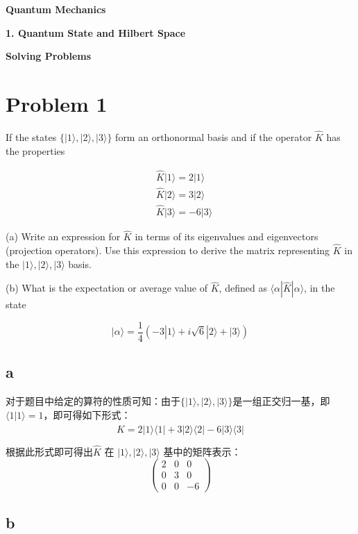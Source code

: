 \documentclass[dvipsnames, svgnames,a4paper,11pt]{article}
\begin{document}
	
	
	
	
	
	\begin{center}
		\LARGE \textbf{Quantum Mechanics }  
		
		\LARGE \textbf{1. Quantum State and Hilbert Space}

		\LARGE \textbf{Solving Problems}
	\end{center}

	\section{Problem 1} 
	If the states $\{|1\rangle,|2\rangle,|3\rangle\}$ form an orthonormal basis and if the operator $\hat{K}$ has the properties

	$$\begin{aligned}&\hat{K}|1\rangle=2|1\rangle\\&\hat{K}|2\rangle=3|2\rangle\\&\hat{K}|3\rangle=-6|3\rangle\end{aligned}$$
	
	(a) Write an expression for $\hat{K}$ in terms of its eigenvalues and eigenvectors (projection operators).
	Use this expression to derive the matrix representing $\hat{K}$ in the $|1\rangle,|2\rangle,|3\rangle$ basis.
	
	(b) What is the expectation or average value of $\hat{K}$, defined as $\langle\alpha|\hat{K}|\alpha\rangle$, in the state
	
	$$|\alpha\rangle=\dfrac{1}{4}(-3|1\rangle+i\sqrt{6}|2\rangle+|3\rangle)$$

\subsection{a}

对于题目中给定的算符的性质可知：由于$\{|1\rangle,|2\rangle,|3\rangle\}$是一组正交归一基，即
$\langle1|1\rangle=1$，即可得如下形式：
\[
\hat{K} = 2|1\rangle\langle1| + 3|2\rangle\langle2| - 6|3\rangle\langle3|
\]

根据此形式即可得出$\hat{K}$ 在 $|1\rangle,|2\rangle,|3\rangle$ 基中的矩阵表示：
$$\begin{pmatrix}2&0&0\\0&3&0\\0&0&-6\end{pmatrix}$$


\subsection{b}
\end{document}
